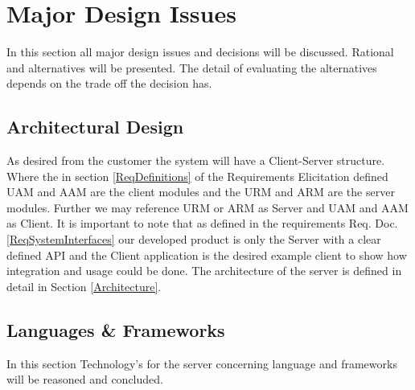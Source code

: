 \documentclass[a4paper,11pt]{article}
\begin{document}
\newpage
\section{Major Design Issues} \label{Major_Design_Issues}
In this section all major design issues and decisions will be discussed. Rational and alternatives will be presented. The detail of evaluating the alternatives depends on the trade off the decision has.

\subsection{Architectural Design} 
As desired from the customer the system will have a Client-Server structure. Where the in section \ref{ReqDefinitions} of the Requirements Elicitation defined UAM and AAM are the client modules and the URM and ARM are the server modules. Further we may reference URM or ARM as Server and UAM and AAM as Client. It is important to note that as defined in the requirements Req. Doc. \ref{ReqSystemInterfaces} our developed product is only the Server with a clear defined API and the Client application is the desired example client to show how integration and usage could be done.
The architecture of the server is defined in detail in Section \ref{Architecture}.

\subsection{Languages \& Frameworks}
In this section Technology's for the server concerning language and frameworks will be reasoned and concluded.
\end{document}
